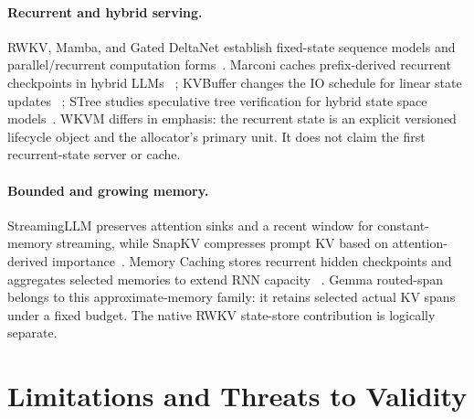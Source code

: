 \documentclass[10pt,letterpaper]{article}
\newcommand{\wkvm}{\textsc{WKVM}}
\begin{document}
\paragraph{Recurrent and hybrid serving.}
RWKV, Mamba, and Gated DeltaNet establish fixed-state sequence models and
parallel/recurrent computation forms~\cite{rwkv,rwkv7,mamba,gateddeltanet}.
Marconi caches prefix-derived recurrent checkpoints in hybrid LLMs
~\cite{marconi}; KVBuffer changes the IO schedule for linear state updates
~\cite{kvbuffer}; STree studies speculative tree verification for hybrid state
space models~\cite{stree}.  \wkvm{} differs in emphasis: the recurrent state is an
explicit versioned lifecycle object and the allocator's primary unit.  It does
not claim the first recurrent-state server or cache.

\paragraph{Bounded and growing memory.}
StreamingLLM preserves attention sinks and a recent window for constant-memory
streaming, while SnapKV compresses prompt KV based on attention-derived
importance~\cite{streamingllm,snapkv}.  Memory Caching stores recurrent hidden
checkpoints and aggregates selected memories to extend RNN capacity
~\cite{memorycaching}.  Gemma routed-span belongs to this approximate-memory
family: it retains selected actual KV spans under a fixed budget.  The native
RWKV state-store contribution is logically separate.

\section{Limitations and Threats to Validity}
\end{document}

